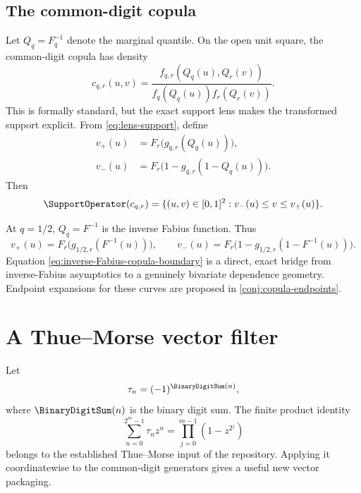 \documentclass[11pt,a4paper]{article}
\theoremstyle{definition}
\theoremstyle{remark}
\begin{document}
\subsection{The common-digit copula}

Let $Q_q=F_q^{-1}$ denote the marginal quantile.  On the open unit square, the common-digit copula has density
\begin{equation}
  c_{q,r}(u,v)
   =\frac{f_{q,r}(Q_q(u),Q_r(v))}
          {f_q(Q_q(u))f_r(Q_r(v))}.
  \label{eq:copula-density}
\end{equation}
This is formally standard, but the exact support lens makes the transformed support explicit.  From \eqref{eq:lens-support}, define
\begin{align}
 v_+(u)&=F_r\bigl(g_{q,r}(Q_q(u))\bigr),\\
 v_-(u)&=F_r\bigl(1-g_{q,r}(1-Q_q(u))\bigr).
 \label{eq:copula-boundaries}
\end{align}
Then
\begin{equation}
  \SupportOperator(c_{q,r})
   =\{(u,v)\in[0,1]^2:v_-(u)\le v\le v_+(u)\}.
  \label{eq:copula-support}
\end{equation}

At $q=1/2$, $Q_q=F^{-1}$ is the inverse Fabius function.  Thus
\begin{equation}
 v_+(u)=F_r\bigl(g_{1/2,r}(F^{-1}(u))\bigr),
 \qquad
 v_-(u)=F_r\bigl(1-g_{1/2,r}(1-F^{-1}(u))\bigr).
 \label{eq:inverse-Fabius-copula-boundary}
\end{equation}
Equation \eqref{eq:inverse-Fabius-copula-boundary} is a direct, exact bridge from inverse-Fabius asymptotics to a genuinely bivariate dependence geometry.  Endpoint expansions for these curves are proposed in \cref{conj:copula-endpoints}.

\section{A Thue--Morse vector filter}
\label{sec:thue-morse}

Let
\begin{equation}
  \tau_n=(-1)^{\BinaryDigitSum(n)},
  \label{eq:tau}
\end{equation}
where $\BinaryDigitSum(n)$ is the binary digit sum.  The finite product identity
\begin{equation}
  \sum_{n=0}^{2^m-1}\tau_nz^n
   =\prod_{j=0}^{m-1}(1-z^{2^j})
  \label{eq:TM-product}
\end{equation}
belongs to the established Thue--Morse input of the repository.  Applying it coordinatewise to the common-digit generators gives a useful new vector packaging.
\end{document}
